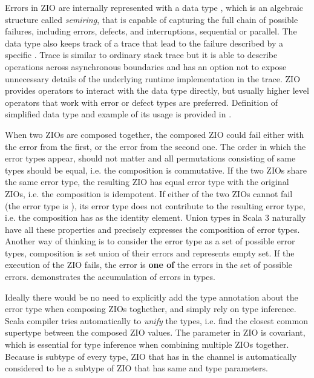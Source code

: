 Errors in ZIO are internally represented with a data type , which is an algebraic structure called \textit{semiring}, that is capable of capturing the full chain of possible failures, including errors, defects, and interruptions, sequential or parallel. The data type also keeps track of a trace that lead to the failure described by a specific . Trace is similar to ordinary stack trace but it is able to describe operations across asynchronous  boundaries and has an option not to expose unnecessary details of the underlying runtime implementation in the trace. ZIO provides operators to interact with the  data type directly, but usually higher level operators that work with error or defect types are preferred. Definition of simplified  data type and example of its usage is provided in .



When two ZIOs are composed together, the composed ZIO could fail either with the error from the first, or the error from the second one. The order in which the error types appear, should not matter and all permutations consisting of same types should be equal, i.e. the composition is commutative. If the two ZIOs share the same error type, the resulting ZIO has equal error type with the original ZIOs, i.e. the composition is idempotent. If either of the two ZIOs cannot fail (the error type is ), its error type does not contribute to the resulting error type, i.e. the composition has  as the identity element. Union types in Scala 3 naturally have all these properties and precisely expresses the composition of error types. Another way of thinking is to consider the error type as a set of possible error types, composition is set union of their errors and  represents empty set. If the execution of the ZIO fails, the error is \textbf{one of} the errors in the set of possible errors.  demonstrates the accumulation of errors in types.



Ideally there would be no need to explicitly add the type annotation about the error type when composing ZIOs toghether, and simply rely on type inference. Scala compiler tries automatically to \textit{unify} the types, i.e. find the closest common supertype between the composed ZIO values. The  parameter in ZIO is covariant, which is essential for type inference when combining multiple ZIOs together. Because  is subtype of every type, ZIO that has  in the  channel is automatically considered to be a subtype of ZIO that has same  and   type parameters.

